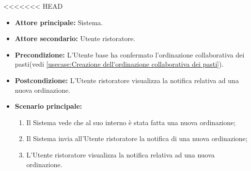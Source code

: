 <<<<<<< HEAD
\label{usecase:Visualizzazione notifica nuovo ordine}
\begin{itemize}
	\item \textbf{Attore principale:} Sistema.

	\item \textbf{Attore secondario:} Utente ristoratore.

	\item \textbf{Precondizione:} L'Utente base ha confermato l'ordinazione collaborativa dei pasti(vedi \autoref{usecase:Creazione dell'ordinazione collaborativa dei pasti}).

	\item \textbf{Postcondizione:} L'Utente ristoratore visualizza la notifica relativa ad una nuova ordinazione.

	\item \textbf{Scenario principale:}
	      \begin{enumerate}
		      \item Il Sistema vede che al suo interno è stata fatta una nuova ordinazione;
		      \item Il Sistema invia all'Utente ristoratore la notifica di una nuova ordinazione;
		      \item L'Utente ristoratore visualizza la notifica relativa ad una nuova ordinazione.
	      \end{enumerate}
\end{itemize}
